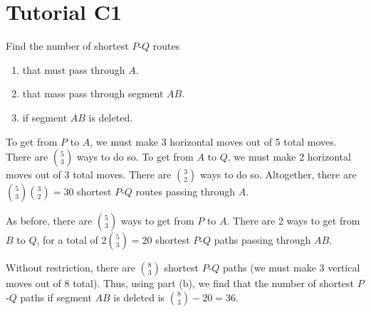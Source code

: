 \section{Tutorial C1}

\begin{problem}
    Find the number of shortest $P$-$Q$ routes
    \begin{enumerate}
        \item that must pass through $A$.
        \item that mass pass through segment $AB$.
        \item if segment $AB$ is deleted.
    \end{enumerate}
    \begin{figure}[H]
    \centering
    \end{figure}
\end{problem}
\begin{solution}
    \begin{ppart}
        To get from $P$ to $A$, we must make 3 horizontal moves out of 5 total moves. There are $\binom{5}{3}$ ways to do so. To get from $A$ to $Q$, we must make 2 horizontal moves out of 3 total moves. There are $\binom{3}{2}$ ways to do so. Altogether, there are $\binom{5}{3} \binom{3}{2} = 30$ shortest $P$-$Q$ routes passing through $A$.
    \end{ppart}
    \begin{ppart}
        As before, there are $\binom{5}{3}$ ways to get from $P$ to $A$. There are 2 ways to get from $B$ to $Q$, for a total of $2 \binom{5}{3} = 20$ shortest $P$-$Q$ paths passing through $AB$.
    \end{ppart}
    \begin{ppart}
        Without restriction, there are $\binom{8}{3}$ shortest $P$-$Q$ paths (we must make 3 vertical moves out of 8 total). Thus, using part (b), we find that the number of shortest $P$-$Q$ paths if segment $AB$ is deleted is $\binom{8}{3} - 20 = 36$.
    \end{ppart}
\end{solution}

